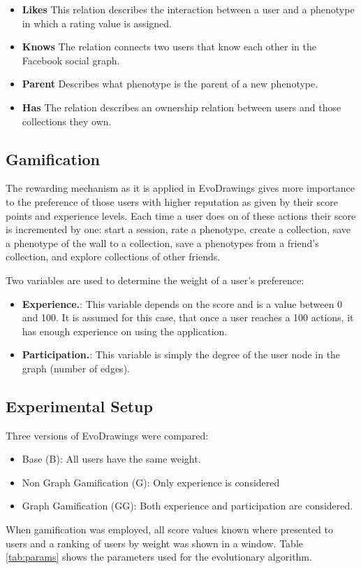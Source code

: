 \begin{itemize}
\item {\bf Likes} This relation describes the interaction between a user and
a phenotype in which a rating value is assigned.

\item {\bf Knows} The relation connects two users that know each
other in the Facebook social graph. 

\item {\bf Parent} Describes what phenotype is the parent of a new
  phenotype. 

\item {\bf Has} The relation describes an ownership relation between users and
those collections they own. 
\end{itemize}

\subsection{Gamification}
The rewarding mechanism as it is applied in EvoDrawings gives more importance 
to the preference of those users with higher reputation
as given by their score points and experience levels.  
Each time a user does on of these actions their score is incremented by one:
start a session, rate a phenotype, create a collection, save a phenotype of 
the wall to a collection, save a phenotypes from a friend's collection, and
explore collections of other friends.

Two variables are used to determine the weight of a user's preference:
\begin{itemize}
\item {\bf Experience.}: This variable depends on the score and is a value 
between 0 and 100. It is assumed for this case, that once a user
reaches a 100 actions, it has enough experience on using the application.   

\item {\bf Participation.}: This variable is simply the degree of the user node 
in the graph (number of edges).    
\end{itemize}

\subsection{Experimental Setup}

Three versions of EvoDrawings were compared:
\begin{itemize}
\item Base (B): All users have the same weight.
\item Non Graph Gamification (G): Only experience is considered
\item Graph Gamification (GG): Both experience and participation are considered.
\end{itemize}
When gamification was employed, all score values known where presented to users
and a ranking of users by weight was shown in a window. Table \ref{tab:params} shows 
the parameters used for the evolutionary algorithm. 


